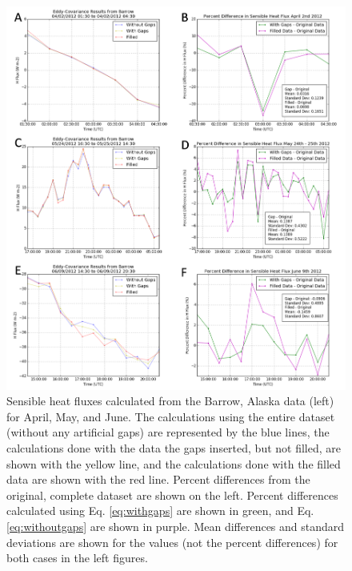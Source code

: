  \begin{figure}[h]
    \centering
        \vspace{-30pt}
    \includegraphics[width=1\linewidth]{figures/appendixb/barrow_fluxes.png}
    \caption[Barrow, Alaska sensible heat flux]{Sensible heat fluxes calculated from the Barrow, Alaska data (left) for April, May, and June. The calculations using the entire dataset (without any artificial gaps) are represented by the blue lines, the calculations done with the data the gaps inserted, but not filled, are shown with the yellow line, and the calculations done with the filled data are shown with the red line. Percent differences from the original, complete dataset are shown on the left. Percent differences calculated using Eq. \ref{eq:withgaps} are shown in green, and Eq. \ref{eq:withoutgaps} are shown in purple. Mean differences and standard deviations are shown for the values (not the percent differences) for both cases in the left figures.}
    \label{fig:barrow_flux}
\end{figure}

